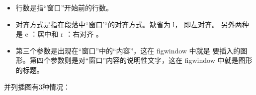 \begin{itemize}
\begin{texinlist}
\begin{figwindow} [行数，对齐方式，图形，标题]\end{figwindow}
  \end{texinlist}
  \begin{itemize}
    \item 行数是指“窗口”开始前的行数。 
    \item 对齐方式是指在段落中“窗口'“的对齐方式。缺省为 l， 即左对齐。 另外两种是 c ：居中和 r ：右对齐 。
    \item 第三个参数是出现在“窗口”中的“内容”，这在 figwindow 中就是 要插入的图形。第四个参数则是对``窗口''内容的说明性文字，这在  figwindow 中就是图形的标题。
  \end{itemize}
\end{itemize}



并列插图有3种情况：

